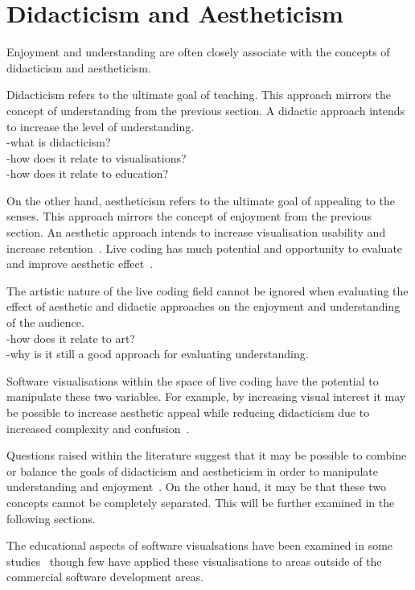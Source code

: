 \section{Didacticism and Aestheticism}

Enjoyment and understanding are often closely associate with the concepts of didacticism and aestheticism.

Didacticism refers to the ultimate goal of teaching. This approach mirrors the concept of understanding from the previous section. A didactic approach intends to increase the level of understanding.\\
-what is didacticism?\\
-how does it relate to visualisations?\\
-how does it relate to education?

On the other hand, aestheticism refers to the ultimate goal of appealing to the senses. This approach mirrors the concept of enjoyment from the previous section. An aesthetic approach intends to increase visualisation usability and increase retention~\cite{Cawthon2007}. Live coding has much potential and opportunity to evaluate and improve aesthetic effect~\cite{Bell}.

The artistic nature of the live coding field cannot be ignored when evaluating the effect of aesthetic and didactic approaches on the enjoyment and understanding of the audience.\\
-how does it relate to art?\\
-why is it still a good approach for evaluating understanding.

Software visualisations within the space of live coding have the potential to manipulate these two variables. For example, by increasing visual interest it may be possible to increase aesthetic appeal while reducing didacticism due to increased complexity and confusion~.

Questions raised within the literature suggest that it may be possible to combine or balance the goals of didacticism and aestheticism in order to manipulate understanding and enjoyment~. On the other hand, it may be that these two concepts cannot be completely separated. This will be further examined in the following sections.

The educational aspects of software visualsations have been examined in some studies~ though few have applied these visualisations to areas outside of the commercial software development areas.

